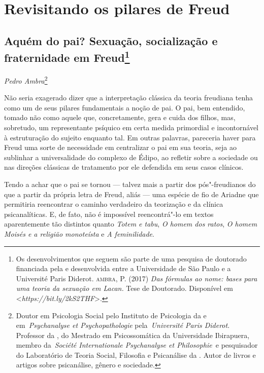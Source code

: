 \part{Revisitando os pilares de Freud}


\chapter*{Aquém do pai? Sexuação, socialização e fraternidade em
  Freud\footnote{Os desenvolvimentos que seguem são parte de uma
    pesquisa de doutorado financiada pela  e desenvolvida entre a
    Universidade de São Paulo e a Université Paris Diderot. \textsc{ambra}, P.
    (2017) \emph{Das fórmulas ao nome: bases para uma teoria da sexuação
    em Lacan.} Tese de Doutorado. Disponível em \textless{}\emph{https://bit.ly/2kS2THF}\textgreater{}.}}

\begin{flushright}
\emph{Pedro Ambra}\footnote{Doutor em Psicologia Social pelo Instituto de Psicologia da  e em \emph{Psychanalyse et Psychopathologie} pela \emph{Université Paris Diderot}. Professor
da , do Mestrado em Psicossomática da Universidade Ibirapuera,
membro da \emph{Société Internationale Psychanalyse et Philosophie} e pesquisador do
Laboratório de Teoria Social, Filosofia e Psicanálise da . Autor de livros e
artigos sobre psicanálise, gênero e sociedade.}
\end{flushright}

Não seria exagerado dizer que a interpretação clássica da teoria
freudiana tenha como um de seus pilares fundamentais a noção de pai. O
pai, bem entendido, tomado não como aquele que, concretamente, gera e
cuida dos filhos, mas, sobretudo, um representante psíquico em certa
medida primordial e incontornável à estruturação do sujeito enquanto
tal. Em outras palavras, pareceria haver para Freud uma sorte de
necessidade em centralizar o pai em sua teoria, seja ao sublinhar a
universalidade do complexo de Édipo, ao refletir sobre a sociedade ou nas
direções clássicas de tratamento por ele defendida em seus casos
clínicos.

Tendo a achar que o pai se tornou --- talvez mais a partir dos
pós"-freudianos do que a partir da própria letra de Freud, aliás --- uma
espécie de fio de Ariadne que permitiria reencontrar o caminho
verdadeiro da teorização e da clínica psicanalíticas. E, de fato, não é
impossível reencontrá"-lo em textos aparentemente tão distintos quanto
\emph{Totem e tabu}, \emph{O homem dos ratos}, \emph{O homem Moisés e a
religião monoteísta} e \emph{A feminilidade}.

